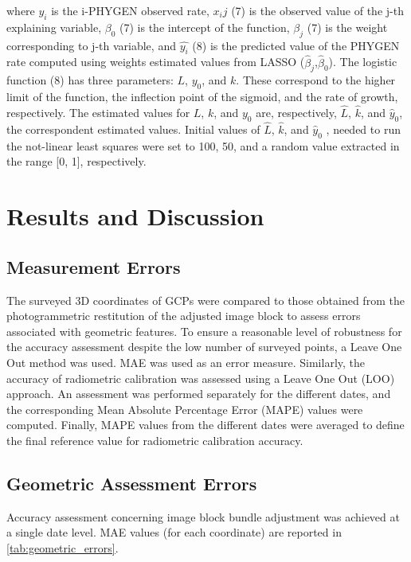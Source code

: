 \documentclass[12pt,a4paper,oneside]{report}
\begin{document}
where $y_i$  is the i-PHYGEN observed rate, $x_ij$ (7) is the observed value of the j-th explaining variable, 
$\beta_0$ (7) is the intercept of the function, $\beta_j$ (7) is the weight corresponding to j-th variable, and
$\hat{y_i}$  (8) is the predicted value of the PHYGEN rate computed using weights estimated values from LASSO
($\hat{\beta}_j$,$\hat{\beta}_0$).
The logistic function (8) has three parameters: $L$, $y_0$, and $k$.
These correspond to the higher limit of the function, the inflection point of the sigmoid, and the rate of growth, respectively. The estimated values for 
$L$, $k$, and $y_0$ are, respectively, $\hat{L}$, $\hat{k}$, and $\hat{y}_0$,
the correspondent estimated values. Initial values of $\hat{L}$, $\hat{k}$, and $\hat{y}_0$
, needed to run the not-linear least squares were set to 100, 50, and a random value extracted in the range [0, 1], respectively.

\section{Results and Discussion}

\subsection{Measurement Errors}

The surveyed 3D coordinates of GCPs were compared to those obtained from the photogrammetric restitution of the adjusted image block to assess errors associated with geometric features. To ensure a reasonable level of robustness for the accuracy assessment despite the low number of surveyed points, a Leave One Out method was used. MAE was used as an error measure.
Similarly, the accuracy of radiometric calibration was assessed using a Leave One Out (LOO) approach. An assessment was performed separately for the different dates, and the corresponding Mean Absolute Percentage Error (MAPE) values were computed. Finally, MAPE values from the different dates were averaged to define the final reference value for radiometric calibration accuracy.

\subsection{Geometric Assessment Errors}

Accuracy assessment concerning image block bundle adjustment was achieved at a single date level. MAE values (for each coordinate) are reported in 
\cref{tab:geometric_errors}.
\end{document}
